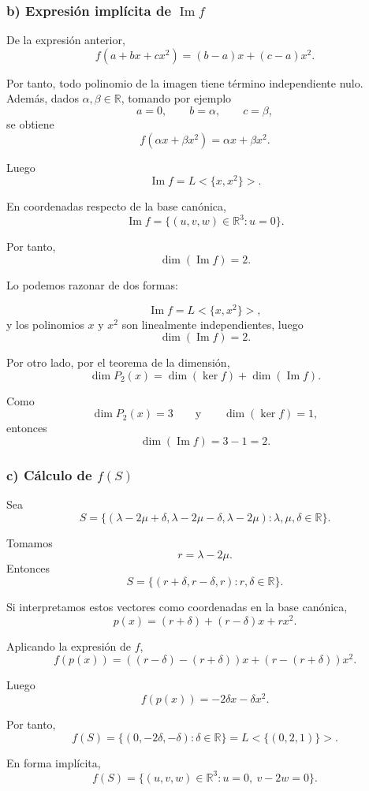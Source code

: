\documentclass[12pt]{article}
\begin{document}
\subsubsection*{b) Expresión implícita de \(\operatorname{Im}f\)}

De la expresión anterior,
\[
f(a+bx+cx^2)=(b-a)x+(c-a)x^2.
\]

Por tanto, todo polinomio de la imagen tiene término independiente nulo.
Además, dados \(\alpha,\beta\in\mathbb{R}\), tomando por ejemplo
\[
a=0,\qquad b=\alpha,\qquad c=\beta,
\]
se obtiene
\[
f(\alpha x+\beta x^2)=\alpha x+\beta x^2.
\]

Luego
\[
\operatorname{Im}f=L<\{x,x^2\}>.
\]

En coordenadas respecto de la base canónica,
\[
\boxed{
\operatorname{Im}f=
\{(u,v,w)\in\mathbb{R}^3:u=0\}.
}
\]

Por tanto,
\[
\boxed{\dim(\operatorname{Im}f)=2.}
\]

Lo podemos razonar de dos formas:

\[
\operatorname{Im}f=L<\{x,x^2\}>,
\]
y los polinomios \(x\) y \(x^2\) son linealmente independientes, luego
\[
\dim(\operatorname{Im}f)=2.
\]

Por otro lado, por el teorema de la dimensión,
\[
\dim P_2(x)=\dim(\ker f)+\dim(\operatorname{Im}f).
\]

Como
\[
\dim P_2(x)=3
\qquad\text{y}\qquad
\dim(\ker f)=1,
\]
entonces
\[
\dim(\operatorname{Im}f)=3-1=2.
\]

\subsubsection*{c) Cálculo de \(f(S)\)}

Sea
\[
S=\{(\lambda-2\mu+\delta,\lambda-2\mu-\delta,\lambda-2\mu):
\lambda,\mu,\delta\in\mathbb{R}\}.
\]

Tomamos
\[
r=\lambda-2\mu.
\]
Entonces
\[
S=\{(r+\delta,r-\delta,r):r,\delta\in\mathbb{R}\}.
\]

Si interpretamos estos vectores como coordenadas en la base canónica,
\[
p(x)=(r+\delta)+(r-\delta)x+rx^2.
\]

Aplicando la expresión de \(f\),
\[
f(p(x))=((r-\delta)-(r+\delta))x+(r-(r+\delta))x^2.
\]

Luego
\[
f(p(x))=-2\delta x-\delta x^2.
\]

Por tanto,
\[
f(S)=\{(0,-2\delta,-\delta):\delta\in\mathbb{R}\}
=L<\{(0,2,1)\}>.
\]

En forma implícita,
\[
\boxed{
f(S)=\{(u,v,w)\in\mathbb{R}^3:u=0,\ v-2w=0\}.
}
\]
\end{document}
